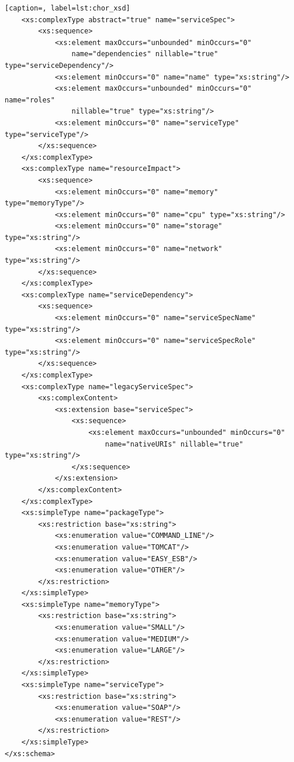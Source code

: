 \documentclass[a4paper, 10pt]{article}
\begin{document}
{\begin{lstlisting}[caption=, label=lst:chor_xsd]
    <xs:complexType abstract="true" name="serviceSpec">
        <xs:sequence>
            <xs:element maxOccurs="unbounded" minOccurs="0"
                name="dependencies" nillable="true" type="serviceDependency"/>
            <xs:element minOccurs="0" name="name" type="xs:string"/>
            <xs:element maxOccurs="unbounded" minOccurs="0" name="roles"
                nillable="true" type="xs:string"/>
            <xs:element minOccurs="0" name="serviceType" type="serviceType"/>
        </xs:sequence>
    </xs:complexType>
    <xs:complexType name="resourceImpact">
        <xs:sequence>
            <xs:element minOccurs="0" name="memory" type="memoryType"/>
            <xs:element minOccurs="0" name="cpu" type="xs:string"/>
            <xs:element minOccurs="0" name="storage" type="xs:string"/>
            <xs:element minOccurs="0" name="network" type="xs:string"/>
        </xs:sequence>
    </xs:complexType>
    <xs:complexType name="serviceDependency">
        <xs:sequence>
            <xs:element minOccurs="0" name="serviceSpecName" type="xs:string"/>
            <xs:element minOccurs="0" name="serviceSpecRole" type="xs:string"/>
        </xs:sequence>
    </xs:complexType>
    <xs:complexType name="legacyServiceSpec">
        <xs:complexContent>
            <xs:extension base="serviceSpec">
                <xs:sequence>
                    <xs:element maxOccurs="unbounded" minOccurs="0"
                        name="nativeURIs" nillable="true" type="xs:string"/>
                </xs:sequence>
            </xs:extension>
        </xs:complexContent>
    </xs:complexType>
    <xs:simpleType name="packageType">
        <xs:restriction base="xs:string">
            <xs:enumeration value="COMMAND_LINE"/>
            <xs:enumeration value="TOMCAT"/>
            <xs:enumeration value="EASY_ESB"/>
            <xs:enumeration value="OTHER"/>
        </xs:restriction>
    </xs:simpleType>
    <xs:simpleType name="memoryType">
        <xs:restriction base="xs:string">
            <xs:enumeration value="SMALL"/>
            <xs:enumeration value="MEDIUM"/>
            <xs:enumeration value="LARGE"/>
        </xs:restriction>
    </xs:simpleType>
    <xs:simpleType name="serviceType">
        <xs:restriction base="xs:string">
            <xs:enumeration value="SOAP"/>
            <xs:enumeration value="REST"/>
        </xs:restriction>
    </xs:simpleType>
</xs:schema>



\end{lstlisting}}
\end{document}
